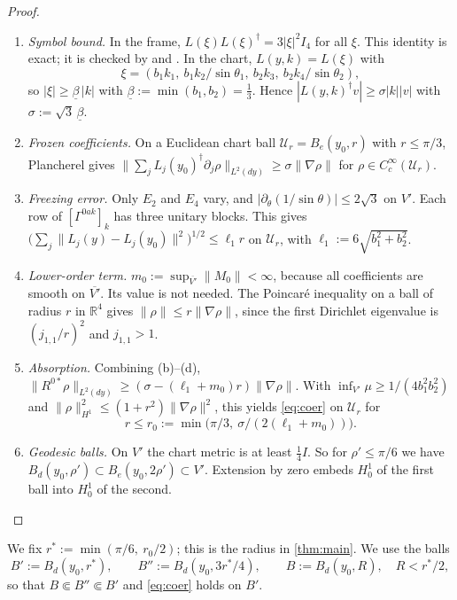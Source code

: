 \documentclass[11pt]{article}
\theoremstyle{plain}
\theoremstyle{definition}
\theoremstyle{remark}
\newcommand{\R}{\mathbb{R}}
\begin{document}
\begin{proof}
\begin{enumerate}[label=(\alph*)]
  \item \emph{Symbol bound.} In the frame, $L(\xi)L(\xi)^\dagger = 3|\xi|^2I_4$ for all $\xi$. This identity is exact; it is checked by  and . In the chart, $L(y,k) = L(\xi)$ with
  \[\xi = (b_1k_1,\ b_1k_2/\sin\theta_1,\ b_2k_3,\ b_2k_4/\sin\theta_2),\]
  so $|\xi| \ge \underline\beta\,|k|$ with $\underline\beta := \min(b_1,b_2) = \tfrac13$. Hence $|L(y,k)^\dagger v| \ge \sigma|k||v|$ with $\sigma := \sqrt3\,\underline\beta$.
  \item \emph{Frozen coefficients.} On a Euclidean chart ball $\mathcal U_r = B_e(y_0,r)$ with $r \le \pi/3$, Plancherel gives $\|\sum_j L_j(y_0)^\dagger\partial_j\rho\|_{L^2(dy)} \ge \sigma\|\nabla\rho\|$ for $\rho \in C^\infty_c(\mathcal U_r)$.
  \item \emph{Freezing error.} Only $E_2$ and $E_4$ vary, and $|\partial_\theta(1/\sin\theta)| \le 2\sqrt3$ on $V'$. Each row of $[\Gamma^{0ak}]_k$ has three unitary blocks. This gives $\bigl(\sum_j\|L_j(y) - L_j(y_0)\|^2\bigr)^{1/2} \le \ell_1 r$ on $\mathcal U_r$, with $\ell_1 := 6\sqrt{b_1^2 + b_2^2}$.
  \item \emph{Lower-order term.} $m_0 := \sup_{\overline{V'}}\|M_0\| < \infty$, because all coefficients are smooth on $\overline{V'}$. Its value is not needed. The Poincaré inequality on a ball of radius $r$ in $\R^4$ gives $\|\rho\| \le r\|\nabla\rho\|$, since the first Dirichlet eigenvalue is $(j_{1,1}/r)^2$ and $j_{1,1} > 1$.
  \item \emph{Absorption.} Combining (b)--(d), $\|R^{0*}\rho\|_{L^2(dy)} \ge (\sigma - (\ell_1 + m_0)r)\|\nabla\rho\|$. With $\inf_{V'}\mu \ge 1/(4b_1^2b_2^2)$ and $\|\rho\|_{H^1}^2 \le (1+r^2)\|\nabla\rho\|^2$, this yields \eqref{eq:coer} on $\mathcal U_r$ for
  \[ r \le r_0 := \min\bigl(\pi/3,\ \sigma/(2(\ell_1 + m_0))\bigr). \]
  \item \emph{Geodesic balls.} On $V'$ the chart metric is at least $\tfrac14 I$. So for $\rho' \le \pi/6$ we have $B_d(y_0,\rho') \subset B_e(y_0,2\rho') \subset V'$. Extension by zero embeds $H^1_0$ of the first ball into $H^1_0$ of the second.
\end{enumerate}
\end{proof}

We fix $r^* := \min(\pi/6,\ r_0/2)$; this is the radius in \cref{thm:main}. We use the balls
\[
  B' := B_d(y_0,r^*),\qquad B'' := B_d(y_0,3r^*/4),\qquad B := B_d(y_0,R),\quad R < r^*/2 ,
\]
so that $B \Subset B'' \Subset B'$ and \eqref{eq:coer} holds on $B'$.
\end{document}
